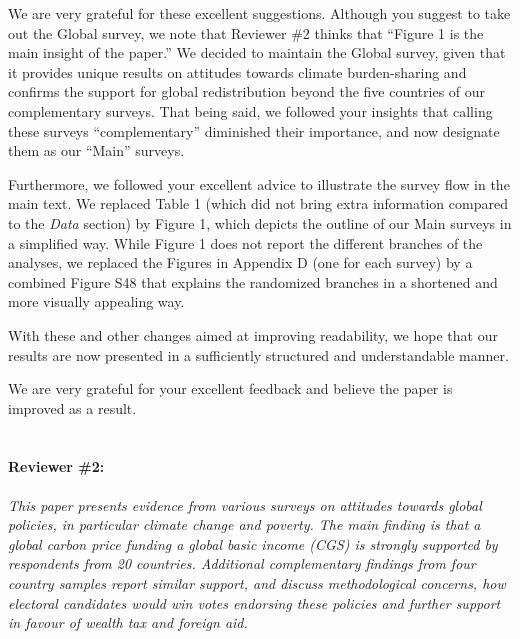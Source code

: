 \documentclass[12pt,english]{article}
\begin{document}
We are very grateful for these excellent suggestions. Although you suggest to take out the Global survey, we note that Reviewer \#2 thinks that ``Figure 1 is the main insight of the paper.'' We decided to maintain the Global survey, given that it provides unique results on attitudes towards climate burden-sharing and confirms the support for global redistribution beyond the five countries of our complementary surveys. That being said, we followed your insights that calling these surveys ``complementary'' diminished their importance, and now designate them as our ``Main'' surveys. 

Furthermore, we followed your excellent advice to illustrate the survey flow in the main text. We replaced Table 1 (which did not bring extra information compared to the \textit{Data} section) by Figure 1, which depicts the outline of our Main surveys in a simplified way. While Figure 1 does not report the different branches of the analyses, we replaced the Figures in Appendix D (one for each survey) by a combined Figure S48 %
that explains the randomized branches in a shortened and more visually appealing way. 

With these and other changes aimed at improving readability, we hope that our results are now presented in a sufficiently structured and understandable manner. 

We are very grateful for your excellent feedback and believe the paper is improved as a result.
~\\ ~\\


\clearpage
\paragraph*{Reviewer \#2:}

\textit{This paper presents evidence from various surveys on attitudes towards global policies, in particular climate change and poverty. The main finding is that a global carbon price funding a global basic income (CGS) is strongly supported by respondents from 20 countries. Additional complementary findings from four country samples report similar support, and discuss methodological concerns, how electoral candidates would win votes endorsing these policies and further support in favour of wealth tax and foreign aid.}
\end{document}
